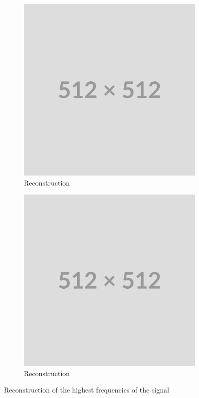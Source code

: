 \begin{figure}
    \begin{subfigure}[b]{0.4\textwidth}
        \centering
        \includegraphics[width=\textwidth]{img/placeholder512.png}
        \caption{Reconstruction}
        \label{fig:rec-35-45}
    \end{subfigure}
    \hfill
    \begin{subfigure}[b]{0.4\textwidth}
        \centering
        \includegraphics[width=\textwidth]{img/placeholder512.png}
        \caption{Reconstruction}
        \label{fig:fft-35-45}
    \end{subfigure}
    \label{f:high-freqs-reconstruction}
    \caption{Reconstruction of the highest frequencies of the signal}
\end{figure}

